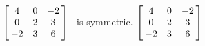 {$\left[\hskip -3pt \begin{array}{ccc} 4&0&-2\\  0&2&3
\\  -2&3&6\end{array}\hskip -3pt \right]$} 
{\tta\ is symmetric. $\left[\hskip -3pt \begin{array}{ccc} 4&0&-2\\  0&2&3\\  -2&3&6\end{array}\hskip -3pt \right]
$}


  


